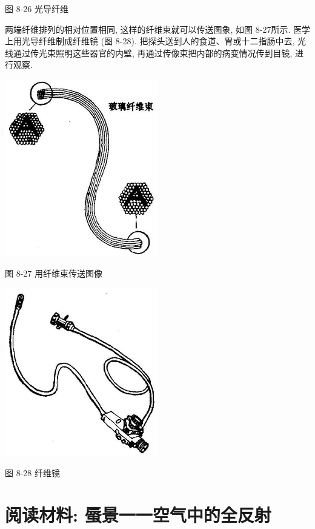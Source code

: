 \documentclass[10pt]{article}
\begin{document}
图 8-26 光导纤维

两端纤维排列的相对位置相同, 这样的纤维束就可以传送图象, 如图 8-27所示. 医学上用光导纤维制成纤维镜 (图 8-28). 把探头送到人的食道、胃或十二指肠中去, 光线通过传光束照明这些器官的内壁, 再通过传像束把内部的病变情况传到目镜, 进行观察.

\begin{center}
\includegraphics[max width=0.5\textwidth]{images/01913056-1f15-74d8-9184-9aab52c9d66b_267_936145.jpg}
\end{center}

图 8-27 用纤维束传送图像

\begin{center}
\includegraphics[max width=0.5\textwidth]{images/01913056-1f15-74d8-9184-9aab52c9d66b_267_457809.jpg}
\end{center}

图 8-28 纤维镜

\section*{阅读材料: 蜃景一一空气中的全反射}
\end{document}
